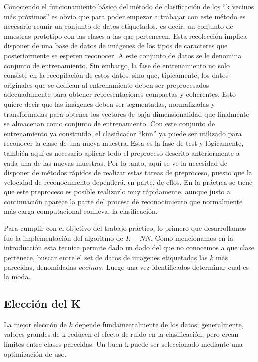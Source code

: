 Conociendo el funcionamiento básico del método de clasificación de los “k vecinos más próximos” es obvio que para poder empezar a trabajar con este método es necesario reunir un conjunto de datos etiquetados, es decir, un conjunto de muestras prototipo con las clases a las que pertenecen. Esta recolección implica disponer de una base de datos de imágenes de los tipos de caracteres que posteriormente se esperen reconocer. A este conjunto de datos se le denomina conjunto de entrenamiento. Sin embargo, la fase de entrenamiento no solo consiste en la recopilación de estos datos, sino que, típicamente, los datos originales que se dedican al
entrenamiento deben ser preprocesados adecuadamente para obtener representaciones compactas y coherentes. Esto quiere decir que  las  imágenes deben ser segmentadas, normalizadas y transformadas para obtener los vectores de baja dimensionalidad que finalmente se almacenan como conjunto de entrenamiento.
Con este conjunto de entrenamiento ya construido, el clasificador “knn” ya puede ser utilizado para reconocer la clase de una nueva muestra. Esta es la fase de test y lógicamente, también aquí es necesario aplicar todo el preproceso descrito anteriormente a cada una de las nuevas muestras. Por lo tanto, aquí se ve la necesidad de disponer de métodos rápidos de realizar estas tareas de preproceso, puesto que la velocidad de reconocimiento dependerá, en parte, de ellos. En la práctica se tiene que este preproceso es posible realizarlo muy rápidamente, aunque justo a continuación aparece la parte del proceso de reconocimiento que normalmente más carga computacional conlleva, la clasificación.



Para cumplir con el objetivo del trabajo práctico, lo primero que desarrollamos fue la implementación del algoritmo de $K-NN$. Como mencionamos en la introducción esta tecnica permite dado un dado del que no conocemos a que clase pertenece, buscar entre el set de datos de imagenes etiquetadas las $k$ más parecidas, denomidadas $vecinas$. Luego una vez identificados determinar cual es la moda.

\subsection {Elección del K}

La mejor elección de $k$ depende fundamentalmente de los datos; generalmente, valores grandes de k reducen el efecto de ruido en la clasificación, pero crean límites entre clases parecidas. Un buen k puede ser seleccionado mediante una optimización de uso.

